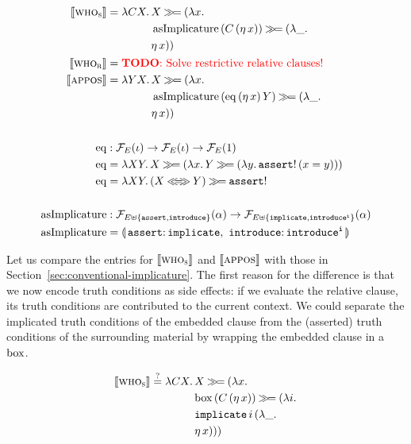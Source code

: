 \begin{align*}
  \sem{\abs{who}_{\abs{s}}} &= \lam{C X}{\begin{aligned}[t]
      &X \hsbind (\lam{x}{ \\
      &\ap{\asImplicature}{(\ap{C}{(\etaE{x})})} \hsbind (\lam{\_}{ \\
      &\etaE{x}})})
    \end{aligned}} \\
  \sem{\abs{who}_{\abs{r}}} &= \text{\TODO{Solve restrictive relative clauses!}} \\
  \lex{appos}{\lam{Y X}{\begin{aligned}[t]
      &X \hsbind (\lam{x}{ \\
      &\ap{\asImplicature}{(\app{\eq}{(\etaE{x})}{Y})} \hsbind (\lam{\_}{ \\
      &\etaE{x}})})
    \end{aligned}}} \\
  \\
  \eq &: \FF_E(\iota) \to \FF_E(\iota) \to \FF_E(1) \\
  \eq &= \lam{X Y}{X \hsbind (\lam{x}{Y \hsbind (\lam{y}{\ap{\op{assert}!}{(x = y)}})})} \\
  \eq &= \lam{X Y}{(X \eqlr Y) \hsbind \op{assert}!} \\
  \\
  \asImplicature &: \FF_{E \uplus \{\op{assert},\op{introduce}\}}(\alpha) \to
                    \FF_{E \uplus \{\op{implicate},\op{introduce^i}\}}(\alpha) \\
  \asImplicature &= \banana{\onto{\op{assert}}{\op{implicate}},\
                            \onto{\op{introduce}}{\op{introduce^i}}}
\end{align*}

Let us compare the entries for $\llbracket \textsc{who}_{\textsc{s}} \rrbracket$ and
$\llbracket \textsc{appos} \rrbracket$ with those in
Section~\ref{sec:conventional-implicature}. The first reason for the
difference is that we now encode truth conditions as side effects: if we
evaluate the relative clause, its truth conditions are contributed to the
current context. We could separate the implicated truth conditions of the
embedded clause from the (asserted) truth conditions of the surrounding
material by wrapping the embedded clause in a $\mathrm{box}$.

$$
\llbracket \textsc{who}_{\textsc{s}} \rrbracket \stackrel{?}{=} \lambda C X.\, \begin{aligned}[t]
    &X \mathbin{\gg\!=} (\lambda x.\,  \\
    &\mathrm{box}\,(C\,(\eta\,x)) \mathbin{\gg\!=} (\lambda i.\,  \\
    &\mathtt{implicate}\,i\,(\lambda \_.\,  \\
    &\eta\,x)))
  \end{aligned}
$$

